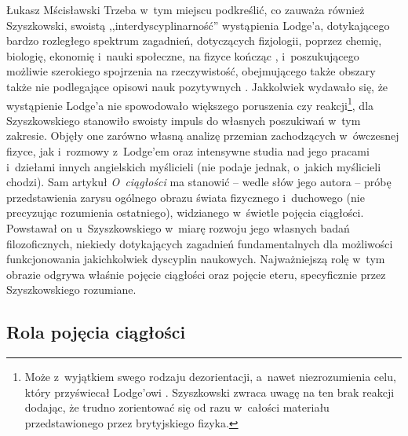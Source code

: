 \begin{artplenv}{Łukasz Mścisławski}
Trzeba w~tym miejscu podkreślić, co zauważa również Szyszkowski, swoistą ,,interdyscyplinarność'' wystąpienia Lodge'a, dotykającego bardzo rozległego spektrum zagadnień, dotyczących fizjologii, poprzez chemię, biologię, ekonomię i~nauki społeczne, na fizyce kończąc
\parencite[][s.~5]{lodge_continuity_1914}, %
 i~poszukującego możliwie szerokiego spojrzenia na rzeczywistość, obejmującego także obszary także nie podlegające opisowi nauk pozytywnych 
\parencite[por.][s.~6]{lodge_continuity_1914}. %
 Jakkolwiek wydawało się, że wystąpienie Lodge'a nie spowodowało większego poruszenia czy reakcji\footnote{Może z~wyjątkiem swego rodzaju dezorientacji, a~nawet niezrozumienia celu, który przyświecał Lodge'owi 
\parencite[por.][s.~45]{szyszkowski_o_1916}. %
 Szyszkowski zwraca uwagę na ten brak reakcji dodając, że trudno zorientować się od razu w~całości materiału przedstawionego przez brytyjskiego fizyka. }, dla Szyszkowskiego stanowiło swoisty impuls do własnych poszukiwań w~tym zakresie. Objęły one zarówno własną analizę przemian zachodzących w~ówczesnej fizyce, jak i~rozmowy z~Lodge'em oraz intensywne studia nad jego pracami i~dziełami innych angielskich myślicieli (nie podaje jednak, o~jakich myślicieli chodzi). Sam artykuł \textit{O~ciągłości} ma stanowić -- wedle słów jego autora -- próbę przedstawienia zarysu ogólnego obrazu świata fizycznego i~duchowego (nie precyzując rozumienia ostatniego), widzianego w~świetle pojęcia ciągłości. Powstawał on u~Szyszkowskiego w~miarę rozwoju jego własnych badań filozoficznych, niekiedy dotykających zagadnień fundamentalnych dla możliwości funkcjonowania jakichkolwiek dyscyplin naukowych. Najważniejszą rolę w~tym obrazie odgrywa właśnie pojęcie ciągłości oraz pojęcie eteru, specyficznie przez Szyszkowskiego rozumiane.

\subsection{Rola pojęcia ciągłości}


\end{artplenv}
